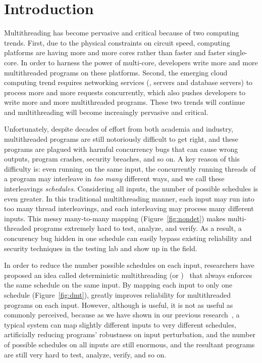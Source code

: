 \chapter{Introduction} \label{sec:intro}

Multithreading has become pervasive and critical because of two computing
trends. First, due to the physical constraints on circuit speed, computing
platforms are having more and more cores rather than faster and faster
single-core. In order to harness the power of multi-core, developers write more
and more multithreaded programs on these platforms. Second, the emerging cloud
computing trend requires networking services (\eg, \http servers and database
servers) to process more and more requests concurrently, which also pushes
developers to write more and more multithreaded programs. These two trends will
continue and multithreading will become increaingly pervasive and critical.

Unfortunately, despite decades of effort from both academia and industry,
multithreaded programs are still notoriously difficult to get right, and these
programs are plagued with harmful concurrency bugs that can cause wrong outputs,
program crashes, security breaches, and so on. A key reason of this difficulty
is: even running on the same input, the concurrently running threads of a
program may interleave in \emph{too many} different ways, and we call these
interleavings \emph{schedules}. Considering all inputs, the number of possible
schedules is even greater. In this traditional multithreading manner, each
input may run into too many thread interleavings, and each interleaving may
process many different inputs. This messy many-to-many mapping
(Figure~\ref{fig:nondet}) makes multi-threaded programs extremely hard to test,
analyze, and verify. As a result, a concurency bug hidden in one schedule can
easily bypass existing reliability and security techniques in the testing lab
and show up in the field.

In order to reduce the number possible schedules on each input, researchers have
proposed an idea called deterministic multithreading (or
\dmt)~\cite{dthreads:sosp11, dpj:oopsla09, dmp:asplos09, kendo:asplos09,
coredet:asplos10} that always enforces the same schedule on the same input. By
mapping each input to only one schedule (Figure~\ref{fig:dmt}), \dmt greatly
improves reliability for multithreaded programs on each input. However, although
\dmt is useful, it is not as useful as commonly perceived, because as we have
shown in our previous research~\cite{cui:tern:osdi10}, a typical \dmt system can
map slightly different inputs to very different schedules, artificially reducing
programs' robustness on input perturbation, and the number of possible schedules
on all inputs are still enormous, and the resultant programs are still very hard
to test, analyze, verify, and so on.


